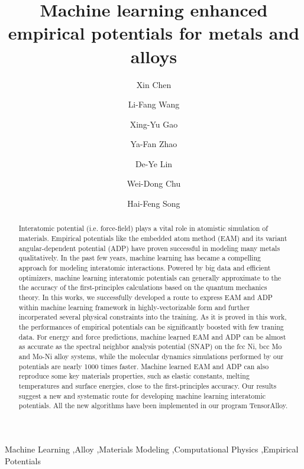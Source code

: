 \documentclass[final,3p,times]{elsarticle}
\begin{document}
\begin{frontmatter}

\title{
    Machine learning enhanced empirical potentials for metals and alloys
}

\author[a]{Xin Chen}
\author[a]{Li-Fang Wang}
\author[a]{Xing-Yu Gao}
\author[b,a]{Ya-Fan Zhao}
\author[b,a]{De-Ye Lin}
\author[a]{Wei-Dong Chu}
\author[a,b]{Hai-Feng Song}

\address[a]{Institute of Applied Physics and Computational Mathematics, 
Beijing 100088, China}
\address[b]{CAEP Software Center for High Performance Numerical Simulation, 
Beijing 100088, China}


% 
%
\begin{abstract}
Interatomic potential (i.e. force-field) plays a vital role in atomistic 
simulation of materials. 
Empirical potentials like the embedded atom method (EAM) and its variant 
angular-dependent potential (ADP) have proven successful in modeling many 
metals qualitatively. In the past few years, machine learning has became a 
compelling approach for modeling interatomic interactions. Powered by big data and 
efficient optimizers, machine learning interatomic potentials can generally 
approximate to the the accuracy of the first-principles calculations based on 
the quantum mechanics theory. In this works, we successfully 
developed a route to express EAM and ADP within machine learning framework in 
highly-vectorizable form and further incorperated several physical constraints 
into the training. As it is proved in this work, the performances of empirical 
potentials can be significantly boosted with few traning data.
For energy and force 
predictions, machine lear̦ned EAM and ADP can be almost as accurate as the 
spectral neighbor analysis potential (SNAP) on the fcc Ni, bcc Mo and Mo-Ni 
alloy systems, while the molecular dynamics simulations performed by our 
potentials are nearly 1000 times faster. Machine learned EAM and ADP can also 
reproduce some key materials properties, such as elastic constants, melting 
temperatures and surface energies, close to the first-principles accuracy. 
Our results suggest a new and systematic route for developing machine learning 
interatomic potentials. All the new algorithms have been implemented in our 
program TensorAlloy.
\end{abstract}

\begin{keyword}
Machine Learning \sep Alloy \sep Materials Modeling \sep Computational Physics 
\sep Empirical Potentials    
\end{keyword}
    
\end{frontmatter}
\end{document}

